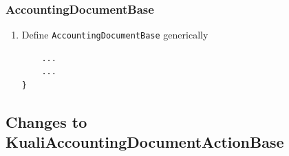 \documentclass[12pt,notitlepage]{article}
\begin{document}
  \subsubsection{AccountingDocumentBase}
  \begin{enumerate}
    \item Define \verb|AccountingDocumentBase| generically
      
      \begin{lstlisting}
    ...
    ...
}
  \end{lstlisting}
  \end{enumerate}

  \subsection{Changes to KualiAccountingDocumentActionBase}
\end{document}
